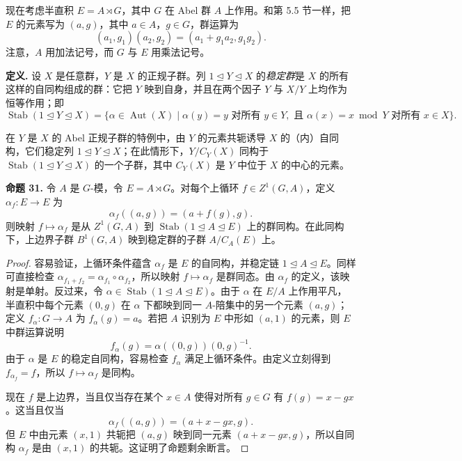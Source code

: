 现在考虑半直积 $E=A\rtimes G$，其中 $G$ 在 Abel 群 $A$ 上作用。和第 5.5 节一样，把 $E$ 的元素写为 $(a,g)$，其中 $a\in A$，$g\in G$，群运算为
\[
  (a_1,g_1)(a_2,g_2)=(a_1+g_1a_2,g_1g_2).
\]
注意，$A$ 用加法记号，而 $G$ 与 $E$ 用乘法记号。

\noindent\textbf{定义.} 设 $X$ 是任意群，$Y$ 是 $X$ 的正规子群。列 $1\trianglelefteq Y\trianglelefteq X$ 的\emph{稳定群}是 $X$ 的所有这样的自同构组成的群：它把 $Y$ 映到自身，并且在两个因子 $Y$ 与 $X/Y$ 上均作为恒等作用；即
\[
\operatorname{Stab}(1\trianglelefteq Y\trianglelefteq X)=\{\alpha\in\operatorname{Aut}(X)\mid \alpha(y)=y\text{ 对所有 }y\in Y,
\text{ 且 }\alpha(x)=x\bmod Y\text{ 对所有 }x\in X\}.
\]

在 $Y$ 是 $X$ 的 Abel 正规子群的特例中，由 $Y$ 的元素共轭诱导 $X$ 的（内）自同构，它们稳定列 $1\trianglelefteq Y\trianglelefteq X$；在此情形下，$Y/C_Y(X)$ 同构于 $\operatorname{Stab}(1\trianglelefteq Y\trianglelefteq X)$ 的一个子群，其中 $C_Y(X)$ 是 $Y$ 中位于 $X$ 的中心的元素。

\medskip
\noindent\textbf{命题 31.} 令 $A$ 是 $G$-模，令 $E=A\rtimes G$。对每个上循环 $f\in Z^1(G,A)$，定义 $\alpha_f:E\to E$ 为
\[
  \alpha_f((a,g))=(a+f(g),g).
\]
则映射 $f\mapsto\alpha_f$ 是从 $Z^1(G,A)$ 到 $\operatorname{Stab}(1\trianglelefteq A\trianglelefteq E)$ 上的群同构。在此同构下，上边界子群 $B^1(G,A)$ 映到稳定群的子群 $A/C_A(E)$ 上。

\begin{proof}
容易验证，上循环条件蕴含 $\alpha_f$ 是 $E$ 的自同构，并稳定链 $1\trianglelefteq A\trianglelefteq E$。同样可直接检查 $\alpha_{f_1+f_2}=\alpha_{f_1}\circ\alpha_{f_2}$，所以映射 $f\mapsto\alpha_f$ 是群同态。由 $\alpha_f$ 的定义，该映射是单射。反过来，令 $\alpha\in\operatorname{Stab}(1\trianglelefteq A\trianglelefteq E)$。由于 $\alpha$ 在 $E/A$ 上作用平凡，半直积中每个元素 $(0,g)$ 在 $\alpha$ 下都映到同一 $A$-陪集中的另一个元素 $(a,g)$；定义 $f_\alpha:G\to A$ 为 $f_\alpha(g)=a$。若把 $A$ 识别为 $E$ 中形如 $(a,1)$ 的元素，则 $E$ 中群运算说明
\[
  f_\alpha(g)=\alpha((0,g))(0,g)^{-1}.
\]
由于 $\alpha$ 是 $E$ 的稳定自同构，容易检查 $f_\alpha$ 满足上循环条件。由定义立刻得到 $f_{\alpha_f}=f$，所以 $f\mapsto\alpha_f$ 是同构。

现在 $f$ 是上边界，当且仅当存在某个 $x\in A$ 使得对所有 $g\in G$ 有 $f(g)=x-gx$。这当且仅当
\[
  \alpha_f((a,g))=(a+x-gx,g).
\]
但 $E$ 中由元素 $(x,1)$ 共轭把 $(a,g)$ 映到同一元素 $(a+x-gx,g)$，所以自同构 $\alpha_f$ 是由 $(x,1)$ 的共轭。这证明了命题剩余断言。
\end{proof}

